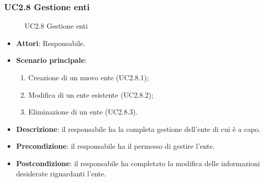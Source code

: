 \subsubsection{UC2.8 Gestione enti}
\begin{figure}[H]
\centering
\noindent{}
\caption{UC2.8 Gestione enti}
\end{figure}
\begin{itemize}
\item \textbf{Attori}: Responsabile.
\item \textbf{Scenario principale}:
\begin{enumerate}
\item Creazione di un nuovo ente (UC2.8.1);
\item Modifica di un ente esistente (UC2.8.2);
\item Eliminazione di un ente (UC2.8.3).
\end{enumerate}
\item \textbf{Descrizione}: il responsabile ha la completa gestione dell'ente di cui è a capo.
\item \textbf{Precondizione}: il responsabile ha il permesso di gestire l'ente.
\item \textbf{Postcondizione}: il responsabile ha completato la modifica delle informazioni desiderate riguardanti l'ente.
\end{itemize}
